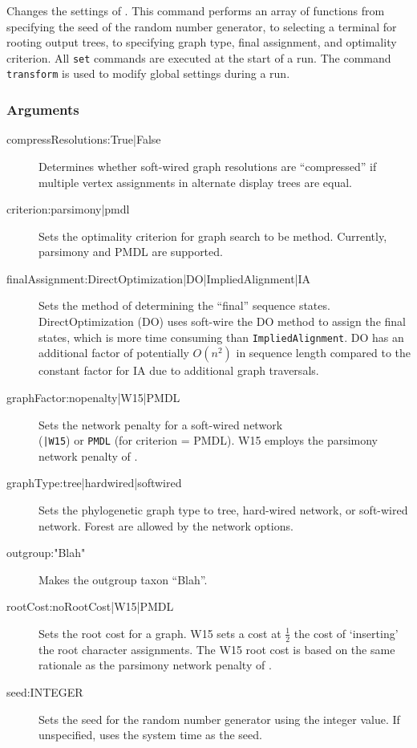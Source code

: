	\begin{phygdescription}
		{Changes the settings of \phyg. This command performs an array of functions
		from specifying the seed of the random number generator, to selecting a terminal for
		rooting output trees, to specifying  graph type, final assignment, and 
		optimality criterion. All \texttt{set} commands are executed at the start of a run. 
		The command \texttt{transform} is used to modify global settings during a run.}
	\end{phygdescription}
			
	\subsubsection{Arguments}
		\begin{description}
			\item[compressResolutions:True|False] Determines whether soft-wired graph 
			resolutions are ``compressed'' if multiple vertex assignments in alternate display 
			trees are equal.
			
			\item[criterion:parsimony|pmdl] Sets the optimality criterion for graph search to be 
			method. Currently, parsimony and PMDL \citep{WheelerandVaron2022} are supported.
			
			\item[finalAssignment:DirectOptimization|DO|ImpliedAlignment|IA] Sets the method 
			of determining the ``final'' sequence states. DirectOptimization (DO) uses soft-wire the DO 
			method to assign the final states, which is more time consuming than \texttt{ImpliedAlignment}. 
			DO has an additional factor of potentially $O(n^2)$ in sequence length compared 
			to the constant factor for IA due to additional graph traversals.
			
			\item[graphFactor:nopenalty|W15|PMDL] Sets the network penalty for a soft-wired network\\ 
			(\texttt{|W15}) or \texttt{PMDL} (for criterion = PMDL). W15 employs the
			parsimony network penalty of \cite{Wheeler2015}.
			
			\item[graphType:tree|hardwired|softwired] Sets the phylogenetic graph type to tree, 
			hard-wired network, or soft-wired network. Forest are allowed by the network options.
			
			\item[outgroup:"Blah"] Makes the outgroup taxon ``Blah''. 
			
			\item[rootCost:noRootCost|W15|PMDL] Sets the root cost for a graph. W15 sets a 
			cost at $\frac{1}{2}$ the cost of `inserting' the root character assignments. 
			The W15 root cost is based on the same rationale as the parsimony network penalty of
			 \cite{Wheeler2015}.
			 
			 \item[seed:INTEGER] Sets the seed for the random number generator using the integer
			 value. If unspecified, \phyg uses the system time as the seed.
		\end{description}
					
